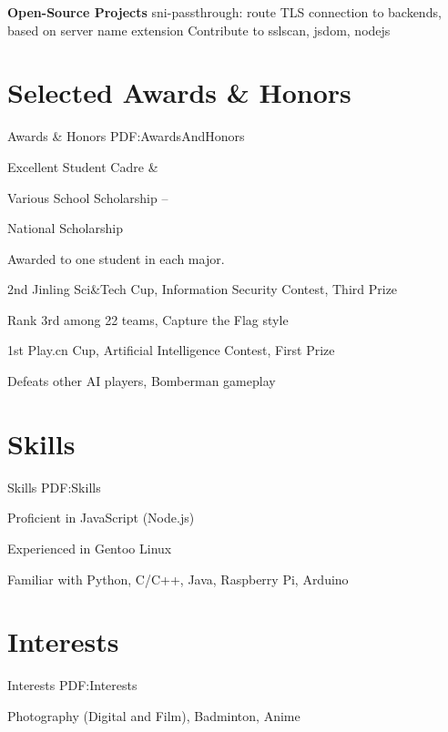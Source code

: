 \documentclass[a4paper,MMMyyyy,nonstop]{simpleresumecv}
\begin{document}
\begin{body}
\GapNoBreak

\textbf{Open-Source Projects}
\BulletItem
sni-passthrough: route TLS connection to backends, based on server name extension
\BulletItem
Contribute to sslscan, jsdom, nodejs


\section
{Selected \newline Awards \& \newline Honors}
{Awards \& Honors}
{PDF:AwardsAndHonors}

\BulletItem
Excellent Student Cadre
\hfill
{} \&
\GapNoBreak

\BulletItem
Various School Scholarship
\hfill
{} --  
\GapNoBreak

\BulletItem
National Scholarship
\hfill
{}
\begin{detail}
\SubItem
Awarded to one student in each major.
\end{detail}
\GapNoBreak

\BulletItem
2nd Jinling Sci\&Tech Cup, Information Security Contest, Third Prize
\hfill
{}
\begin{detail}
\SubItem
Rank 3rd among 22 teams, Capture the Flag style
\end{detail}
\GapNoBreak

\BulletItem
1st Play.cn Cup, Artificial Intelligence Contest, First Prize
\hfill
{}
\begin{detail}
\SubItem
Defeats other AI players, Bomberman gameplay
\end{detail}


\section
{Skills}
{Skills}
{PDF:Skills}

\BulletItem
Proficient in JavaScript (Node.js)

\BulletItem
Experienced in Gentoo Linux

\BulletItem
Familiar with Python, C/C++, Java, Raspberry Pi, Arduino


\section
{Interests}
{Interests}
{PDF:Interests}

Photography (Digital and Film), Badminton, Anime

\end{body}
\end{document}
